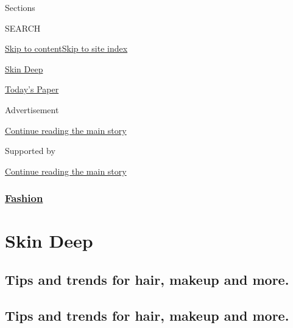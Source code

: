 Sections

SEARCH

\protect\hyperlink{site-content}{Skip to
content}\protect\hyperlink{site-index}{Skip to site index}

\href{https://www.nytimes3xbfgragh.onion/column/skin-deep}{Skin Deep}

\href{https://myaccount.nytimes3xbfgragh.onion/auth/login?response_type=cookie\&client_id=vi}{}

\href{https://www.nytimes3xbfgragh.onion/section/todayspaper}{Today's
Paper}

Advertisement

\protect\hyperlink{after-top}{Continue reading the main story}

Supported by

\protect\hyperlink{after-sponsor}{Continue reading the main story}

\hypertarget{fashion}{%
\subsubsection{\texorpdfstring{\href{/section/fashion}{Fashion}}{Fashion}}\label{fashion}}

\hypertarget{skin-deep}{%
\section{Skin Deep}\label{skin-deep}}

\hypertarget{tips-and-trends-for-hair-makeup-and-more}{%
\subsection{Tips and trends for hair, makeup and
more.}\label{tips-and-trends-for-hair-makeup-and-more}}

\hypertarget{tips-and-trends-for-hair-makeup-and-more-1}{%
\subsection{Tips and trends for hair, makeup and
more.}\label{tips-and-trends-for-hair-makeup-and-more-1}}

